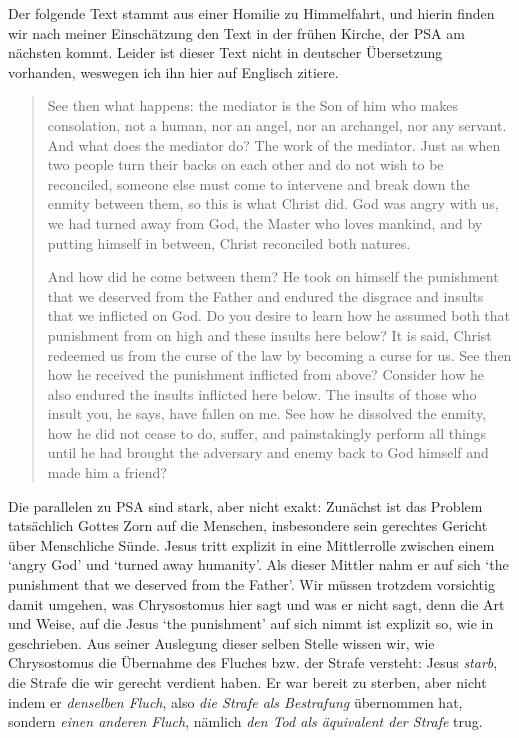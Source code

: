 Der folgende Text stammt aus einer Homilie zu Himmelfahrt, und hierin finden wir nach meiner Einschätzung den Text in der frühen Kirche, der PSA am nächsten kommt.
Leider ist dieser Text nicht in deutscher Übersetzung vorhanden, weswegen ich ihn hier auf Englisch zitiere.
\begin{quote}
	See then what happens: the mediator is the Son of him who makes consolation, not a human, nor an angel, nor an archangel, nor any servant.
	And what does the mediator do? The work of the mediator.
	Just as when two people turn their backs on each other and do not wish to be reconciled, someone else must come to intervene and break down the enmity between them, so this is what Christ did.
	God was angry with us, we had turned away from God, the Master who loves mankind, and by putting himself in between, Christ reconciled both natures. 

And how did he come between them? He took on himself the punishment that we deserved from the Father and endured the disgrace and insults that we inflicted on God.
Do you desire to learn how he assumed both that punishment from on high and these insults here below? It is said, Christ redeemed us from the curse of the law by becoming a curse for us.
See then how he received the punishment inflicted from above? Consider how he also endured the insults inflicted here below.
The insults of those who insult you, he says, have fallen on me.
See how he dissolved the enmity, how he did not cease to do, suffer, and painstakingly perform all things until he had brought the adversary and enemy back to God himself and made him a friend?
\end{quote}
Die parallelen zu PSA sind stark, aber nicht exakt: Zunächst ist das Problem tatsächlich Gottes Zorn auf die Menschen, insbesondere sein gerechtes Gericht über Menschliche Sünde.
Jesus tritt explizit in eine Mittlerrolle zwischen einem `angry God' und `turned away humanity'.
Als dieser Mittler nahm er auf sich `the punishment that we deserved from the Father'.
Wir müssen trotzdem vorsichtig damit umgehen, was Chrysostomus hier sagt und was er nicht sagt, denn die Art und Weise, auf die Jesus `the punishment' auf sich nimmt ist explizit so, wie in  geschrieben.
Aus seiner Auslegung dieser selben Stelle wissen wir, wie Chrysostomus die Übernahme des Fluches bzw. der Strafe versteht:
Jesus \textit{starb}, die Strafe die wir gerecht verdient haben. Er war bereit zu sterben, aber nicht indem er \textit{denselben Fluch}, also \textit{die Strafe als Bestrafung} übernommen hat, sondern \textit{einen anderen Fluch}, nämlich \textit{den Tod als äquivalent der Strafe} trug.

